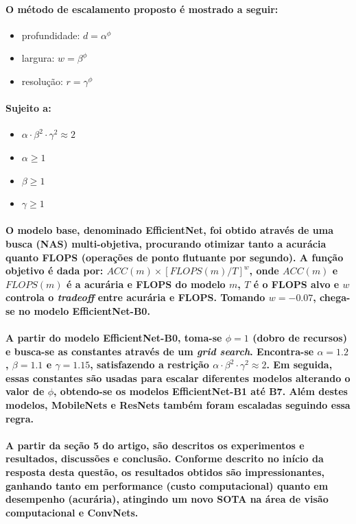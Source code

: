 \documentclass[a4paper]{article}    %
\begin{document}
\paragraph{O método de escalamento proposto é mostrado a seguir:}
\begin{itemize}
    \item profundidade: $d = \alpha^\phi$
    \item largura: $w = \beta^\phi$
    \item resolução: $r = \gamma^\phi$
\end{itemize}
\paragraph{Sujeito a:}
\begin{itemize}
    \item $\alpha \cdot \beta^2 \cdot \gamma^2 \approx 2$
    \item $\alpha \geq 1$
    \item $\beta \geq 1$
    \item $\gamma \geq 1$
\end{itemize}

\paragraph{O modelo base, denominado EfficientNet, foi obtido através de uma busca (NAS) multi-objetiva, procurando otimizar tanto a acurácia quanto FLOPS (operações de ponto flutuante por segundo). A função objetivo é dada por: $ACC(m) \times [FLOPS(m)/T]^w$, onde $ACC(m)$ e $FLOPS(m)$ é a acurária e FLOPS do modelo $m$, $T$ é o FLOPS alvo e $w$ controla o \emph{tradeoff} entre acurária e FLOPS. Tomando $w = -0.07$, chega-se no modelo EfficientNet-B0.}

\paragraph{A partir do modelo EfficientNet-B0, toma-se $\phi=1$ (dobro de recursos) e busca-se as constantes através de um \emph{grid search}. Encontra-se $\alpha=1.2$, $\beta=1.1$ e $\gamma=1.15$, satisfazendo a restrição $\alpha \cdot \beta^2 \cdot \gamma^2 \approx 2$. Em seguida, essas constantes são usadas para escalar diferentes modelos alterando o valor de $\phi$, obtendo-se os modelos EfficientNet-B1 até B7. Além destes modelos, MobileNets e ResNets também foram escaladas seguindo essa regra.}

\paragraph{A partir da seção 5 do artigo, são descritos os experimentos e resultados, discussões e conclusão. Conforme descrito no início da resposta desta questão, os resultados obtidos são impressionantes, ganhando tanto em performance (custo computacional) quanto em desempenho (acurária), atingindo um novo SOTA na área de visão computacional e ConvNets.}
\end{document}
